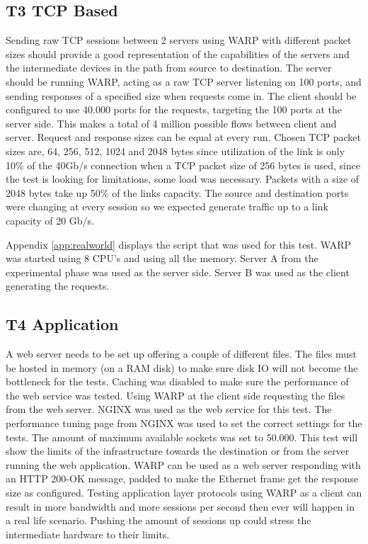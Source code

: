 \subsection{T3 TCP Based}
Sending raw TCP sessions between 2 servers using WARP with different packet sizes should provide a good representation of the capabilities of the servers and the intermediate devices in the path from source to destination. 
The server should be running WARP, acting as a raw TCP server listening on 100 ports, and sending responses of a specified size when requests come in. The client should be configured to use 40.000 ports for the requests, targeting the 100 ports at the server side. This makes a total of 4 million possible flows between client and server. Request and response sizes can be equal at every run. 
Chosen TCP packet sizes are, 64, 256, 512, 1024 and 2048 bytes since utilization of the link is only 10\% of the 40Gb/s connection when a TCP packet size of 256 bytes is used, since the test is looking for limitations, some load was necessary. Packets with a size of 2048 bytes take up 50\% of the links capacity.   
The source and destination ports were changing at every session so we expected generate traffic up to a link capacity of 20 Gb/s.  

Appendix \ref{app:realworld} displays the script that was used for this test. WARP was started using 8 CPU's and using all the memory. 
Server A from the experimental phase was used as the server side. Server B was used as the client generating the requests.

\subsection{T4 Application}\label{sub:t4real}
A web server needs to be set up offering a couple of different files. The files must be hosted in memory (on a RAM disk) to make sure disk IO will not become the bottleneck for the tests. Caching was disabled to make sure the performance of the web service was tested. Using WARP at the client side requesting the files from the web server. NGINX\cite{nginx} was used as the web service for this test. The performance tuning page from NGINX was used to set the correct settings for the tests\cite{nginxtuning}. The amount of maximum available sockets was set to 50.000. This test will show the limits of the infrastructure towards the destination or from the server running the web application. 
WARP can be used as a web server responding with an HTTP 200-OK message, padded to make the Ethernet frame get the response size as configured. Testing application layer protocols using WARP as a client can result in more bandwidth and more sessions per second then ever will happen in a real life scenario. Pushing the amount of sessions up could stress the intermediate hardware to their limits.

\
